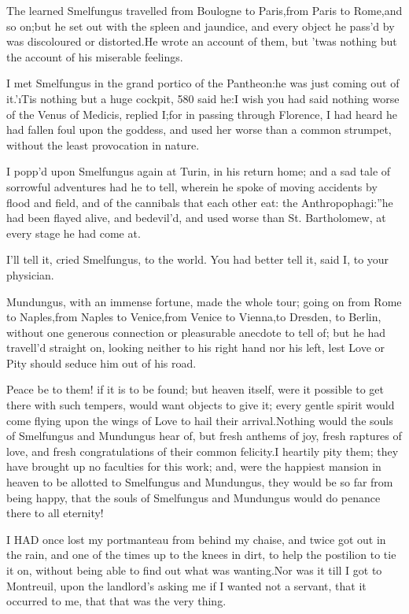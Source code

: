 \documentclass[twoside]{article}
\begin{document}
The learned Smelfungus travelled from Boulogne to Paris,\tsk from Paris to
Rome,\tsk and so on;\tsk but he set out with the spleen and jaundice, and every
object he pass’d by was discoloured or distorted.\tsk He wrote an account of
them, but ’twas nothing but the account of his miserable feelings.

I met Smelfungus in the grand portico of the Pantheon:\tsk he was just coming
out of it.\tsk ’\i{Tis nothing but a huge cockpit}, {580} said he:\tsk I wish you
had said nothing worse of the Venus of Medicis, replied I;\tsk for in passing
through Florence, I had heard he had fallen foul upon the goddess, and
used her worse than a common strumpet, without the least provocation in
nature.

I popp’d upon Smelfungus again at Turin, in his return home; and a sad
tale of sorrowful adventures had he to tell, \lqq wherein he spoke of moving
accidents by flood and field, and of the cannibals that each other eat:
the Anthropophagi:”\tsk he had been flayed alive, and bedevil’d, and used
worse than St. Bartholomew, at every stage he had come at.\tsk 

\tsk I’ll tell it, cried Smelfungus, to the world.  You had better tell it,
said I, to your physician.

Mundungus, with an immense fortune, made the whole tour; going on from
Rome to Naples,\tsk from Naples to Venice,\tsk from Venice to Vienna,\tsk to Dresden,
to Berlin, without one generous connection or pleasurable anecdote to
tell of; but he had travell’d straight on, looking neither to his right
hand nor his left, lest Love or Pity should seduce him out of his road.

Peace be to them! if it is to be found; but heaven itself, were it
possible to get there with such tempers, would want objects to give it;
every gentle spirit would come flying upon the wings of Love to hail
their arrival.\tsk Nothing would the souls of Smelfungus and Mundungus hear
of, but fresh anthems of joy, fresh raptures of love, and fresh
congratulations of their common felicity.\tsk I heartily pity them; they have
brought up no faculties for this work; and, were the happiest mansion in
heaven to be allotted to Smelfungus and Mundungus, they would be so far
from being happy, that the souls of Smelfungus and Mundungus would do
penance there to all eternity!






I HAD once lost my portmanteau from behind my chaise, and twice got out
in the rain, and one of the times up to the knees in dirt, to help the
postilion to tie it on, without being able to find out what was
wanting.\tsk Nor was it till I got to Montreuil, upon the landlord’s asking
me if I wanted not a servant, that it occurred to me, that that was the
very thing.
\end{document}
